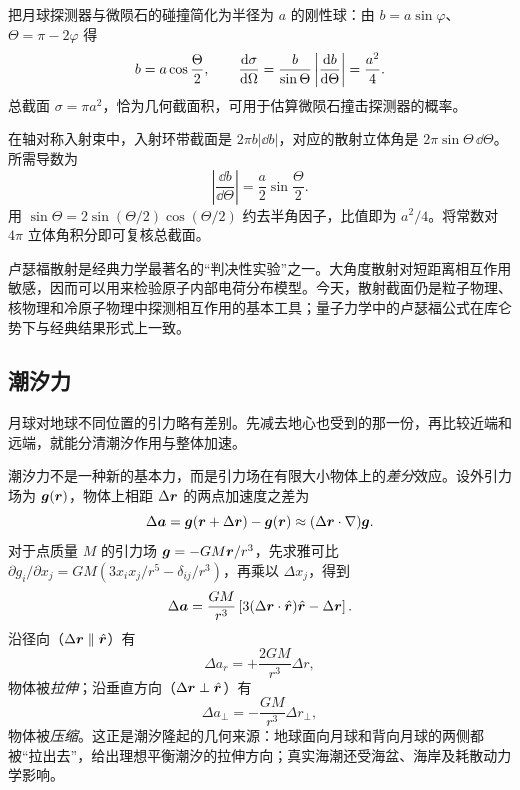 \begin{example}[月球探测器与微陨石的刚球散射]
把月球探测器与微陨石的碰撞简化为半径为 $a$ 的刚性球：由 $b=a\sin\varphi$、$\Theta=\pi-2\varphi$ 得
\[
b=a\cos\frac{\Theta}{2},\qquad
\frac{\mathrm{d} \sigma}{\mathrm{d} \Omega}
=\frac{b}{\sin\Theta}\left|\frac{\mathrm{d} b}{\mathrm{d} \Theta}\right|
=\frac{a^2}{4}.
\]
总截面 $\sigma=\pi a^2$，恰为几何截面积，可用于估算微陨石撞击探测器的概率。

在轴对称入射束中，入射环带截面是 $2\pi b|\dd b|$，对应的散射立体角是 $2\pi\sin\Theta\,\dd\Theta$。所需导数为
\[
\left|\frac{\dd b}{\dd\Theta}\right|=\frac a2\sin\frac\Theta2 .
\]
用 $\sin\Theta=2\sin(\Theta/2)\cos(\Theta/2)$ 约去半角因子，比值即为 $a^2/4$。将常数对 $4\pi$ 立体角积分即可复核总截面。
\end{example}

\begin{modernbox}
卢瑟福散射是经典力学最著名的“判决性实验”之一。大角度散射对短距离相互作用敏感，因而可以用来检验原子内部电荷分布模型。今天，散射截面仍是粒子物理、核物理和冷原子物理中探测相互作用的基本工具；量子力学中的卢瑟福公式在库仑势下与经典结果形式上一致。
\end{modernbox}

\subsection{潮汐力}

月球对地球不同位置的引力略有差别。先减去地心也受到的那一份，再比较近端和远端，就能分清潮汐作用与整体加速。

潮汐力不是一种新的基本力，而是引力场在有限大小物体上的\emph{差分}效应。设外引力场为 $\boldsymbol{g}(\boldsymbol{r})$，物体上相距 $\Delta\boldsymbol{r}$ 的两点加速度之差为
\begin{equation}
\Delta\boldsymbol{a}=\boldsymbol{g}(\boldsymbol{r}+\Delta\boldsymbol{r})-\boldsymbol{g}(\boldsymbol{r})
\approx(\Delta\boldsymbol{r}\cdot\nabla)\boldsymbol{g} .
\label{eq:tidal-def}
\end{equation}
对于点质量 $M$ 的引力场 $\boldsymbol{g}=-GM\boldsymbol{r}/r^3$，先求雅可比 $\partial g_i/\partial x_j=GM(3x_ix_j/r^5-\delta_{ij}/r^3)$，再乘以 $\Delta x_j$，得到
\begin{equation}
\Delta\boldsymbol{a}=\frac{GM}{r^3}\left[3(\Delta\boldsymbol{r}\cdot\hat{\boldsymbol{r}})\hat{\boldsymbol{r}}-\Delta\boldsymbol{r}\right].
\label{eq:tidal-acceleration}
\end{equation}
沿径向（$\Delta\boldsymbol{r}\parallel\hat{\boldsymbol{r}}$）有
\[
\Delta a_r=+\frac{2GM}{r^3}\Delta r,
\]
物体被\emph{拉伸}；沿垂直方向（$\Delta\boldsymbol{r}\perp\hat{\boldsymbol{r}}$）有
\[
\Delta a_\perp=-\frac{GM}{r^3}\Delta r_\perp,
\]
物体被\emph{压缩}。这正是潮汐隆起的几何来源：地球面向月球和背向月球的两侧都被“拉出去”，给出理想平衡潮汐的拉伸方向；真实海潮还受海盆、海岸及耗散动力学影响。

